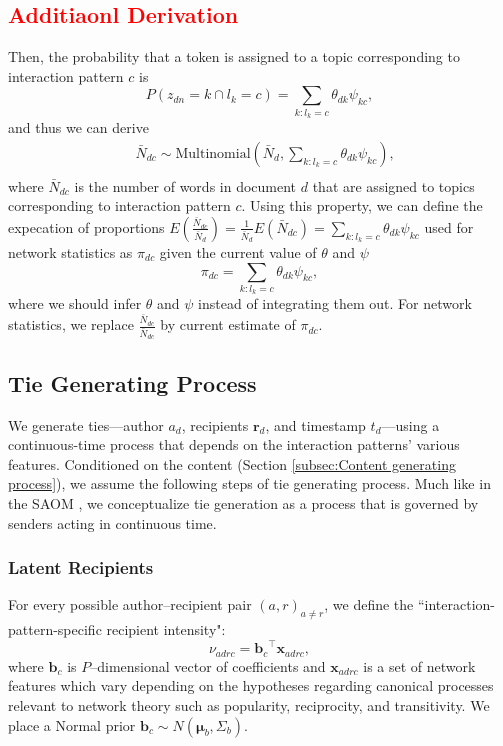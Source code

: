 \documentclass{article}
\begin{document}
\textcolor{red}{\subsection{Additiaonl Derivation}}\label{subsec: Multinomial}
Then, the probability that a token is assigned to a topic corresponding to interaction pattern $c$ is
\begin{equation}
P(z_{dn}=k \cap l_k = c) = \sum_{k:l_k=c}{\theta}_{dk}\psi_{kc},
\end{equation}
and thus we can derive 
\begin{equation}
\begin{aligned}
&\bar N_{dc} \sim \mbox{Multinomial}(\bar N_{d} , \sum_{k:l_k=c}{\theta}_{dk}\psi_{kc}),\\
\end{aligned}
\end{equation}
where $\bar N_{dc}$ is the number of words in document $d$ that are assigned to topics corresponding to interaction pattern $c$. Using this property, we can define the expecation of proportions $E(\frac{\bar N_{dc} }{\bar N_{d}})=\frac{1}{\bar N_{d}}E(\bar N_{dc} )=\sum_{k:l_k=c}{\theta}_{dk}\psi_{kc}$ used for network statistics as $\pi_{dc}$ given the current value of $\theta$ and $\psi$
\begin{equation}
\pi_{dc}= \sum_{k:l_k=c}{\theta}_{dk}\psi_{kc},
\end{equation}
where we should infer $\theta$ and $\psi$ instead of integrating them out.
For network statistics, we replace $\frac{\bar N_{dc} }{\bar N_{dc}}$ by current estimate of $\pi_{dc}$.

\subsection{Tie Generating Process}\label{subsec:Tie generating process}
We generate ties---author $a_d$, recipients $\boldsymbol{r}_d$, and timestamp $t_d$---using a continuous-time process
that depends on the interaction patterns' various features. Conditioned on the content (Section \ref{subsec:Content generating process}), we assume the following steps of tie generating process. Much like in the SAOM \cite{snijders2010introduction}, we conceptualize tie generation as a process that is governed by senders acting in continuous time. 

\subsubsection{Latent Recipients}\label{subsubsec:Hypothetical Recipients}
For every possible author--recipient pair $(a,r)_{a \neq r}$, we define the ``interaction-pattern-specific recipient intensity":
\begin{equation}
\nu_{adrc} = {\boldsymbol{b}_c}^{\top}\boldsymbol{x}_{adrc},
\end{equation}
where $\boldsymbol{b}_c$ is $P$--dimensional vector of coefficients and $\boldsymbol{x}_{adrc}$ is a set of network features which vary depending on the hypotheses regarding canonical processes relevant to network theory such as popularity, reciprocity, and transitivity. We place a Normal prior $\boldsymbol{b}_c \sim N(\boldsymbol{\mu}_b, \Sigma_b)$.
\end{document}
